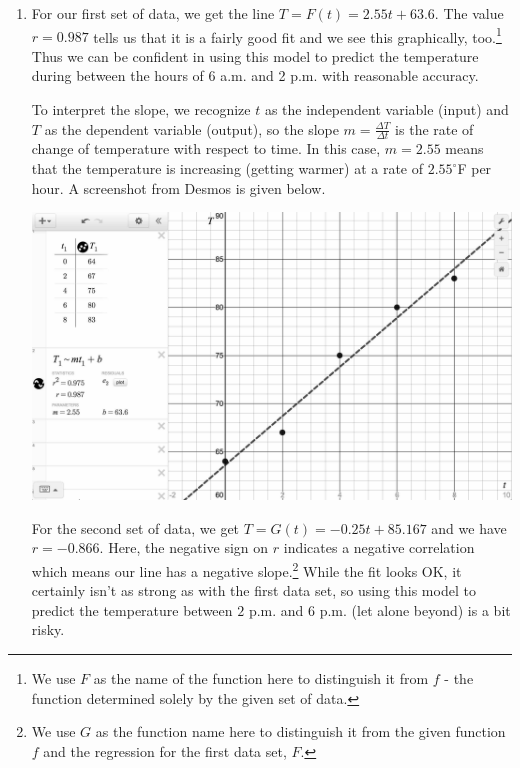 \documentclass{ximera}
\begin{document}
\begin{example}
\begin{enumerate}
 \item For our first set of data, we get the line $T = F(t) = 2.55t + 63.6$.  The value $r = 0.987$ tells us that it is a fairly good fit and we see this graphically, too.\footnote{We use $F$ as the name of the function here to distinguish it from $f$ - the function determined solely by the given set of data.}   Thus we can be confident in using this model to predict the temperature during between the hours of 6 a.m. and 2 p.m. with reasonable accuracy.   



To interpret the slope, we recognize $t$ as the independent variable (input) and $T$ as the dependent variable (output), so the slope $m = \frac{\Delta T}{\Delta t}$ is the rate of change of temperature with respect to time.   In this case,  $m = 2.55$ means that the temperature is increasing (getting warmer) at a rate of $2.55^{\circ}$F per hour.  A screenshot from Desmos is given below.

\begin{center}
\includegraphics[width=6in]{./ConstantandLinearFunctionsGraphics/TimeTempRegression01.jpg}
\end{center}
  
For the second set of data, we get $T = G(t) = -0.25t + 85.167$ and we have $r = -0.866$.  Here, the negative sign on $r$ indicates a negative correlation which means our line has a negative slope.\footnote{We use $G$ as the function name here to distinguish it from the given function $f$ and the regression for the first data set, $F$.} While the fit looks OK, it certainly isn't as strong as with the first data set, so using this model to predict the temperature between $2$ p.m. and $6$ p.m. (let alone beyond) is a bit risky.  




\end{enumerate}
\end{example}
\end{document}

